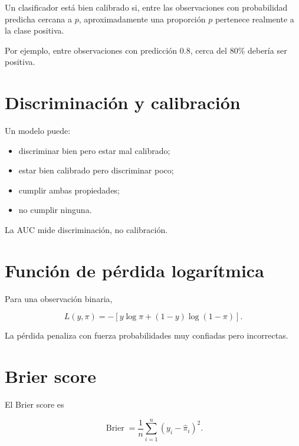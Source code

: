 \documentclass[
  spanish,
  10.5pt,
  letterpaper,
  DIV=11,
  numbers=noendperiod,
  oneside,
  open=any]{scrreprt}
\providecommand{\tightlist}{%
  \setlength{\itemsep}{0pt}\setlength{\parskip}{0pt}}
\theoremstyle{definition}
\theoremstyle{definition}
\theoremstyle{plain}
\theoremstyle{remark}
\begin{document}
Un clasificador está bien calibrado si, entre las observaciones con
probabilidad predicha cercana a \(p\), aproximadamente una proporción
\(p\) pertenece realmente a la clase positiva.

Por ejemplo, entre observaciones con predicción \(0.8\), cerca del
\(80\%\) debería ser positiva.

\section*{Discriminación y
calibración}\label{discriminaciuxf3n-y-calibraciuxf3n}


Un modelo puede:

\begin{itemize}
\tightlist
\item
  discriminar bien pero estar mal calibrado;
\item
  estar bien calibrado pero discriminar poco;
\item
  cumplir ambas propiedades;
\item
  no cumplir ninguna.
\end{itemize}

La AUC mide discriminación, no calibración.

\section*{Función de pérdida
logarítmica}\label{funciuxf3n-de-puxe9rdida-logaruxedtmica}


Para una observación binaria,

\[
L(y,\pi)
=
-
\left[
y\log\pi
+
(1-y)\log(1-\pi)
\right].
\]

La pérdida penaliza con fuerza probabilidades muy confiadas pero
incorrectas.

\section*{Brier score}\label{brier-score}


El Brier score es

\[
\operatorname{Brier}
=
\frac{1}{n}
\sum_{i=1}^{n}
(
y_i-\widehat{\pi}_i
)^2.
\]
\end{document}
